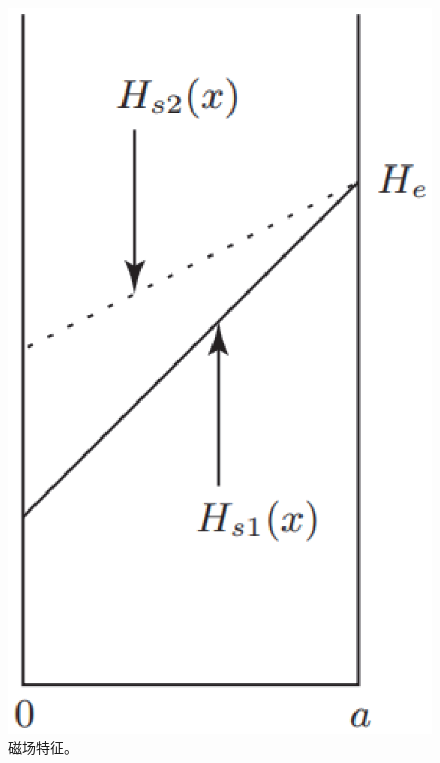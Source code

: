 \begin{figure}[htbp]
	\centering
	\includegraphics[scale=0.5]{chpt5/figs/fig5.18.eps}
	\caption{磁场特征。}
\end{figure}

